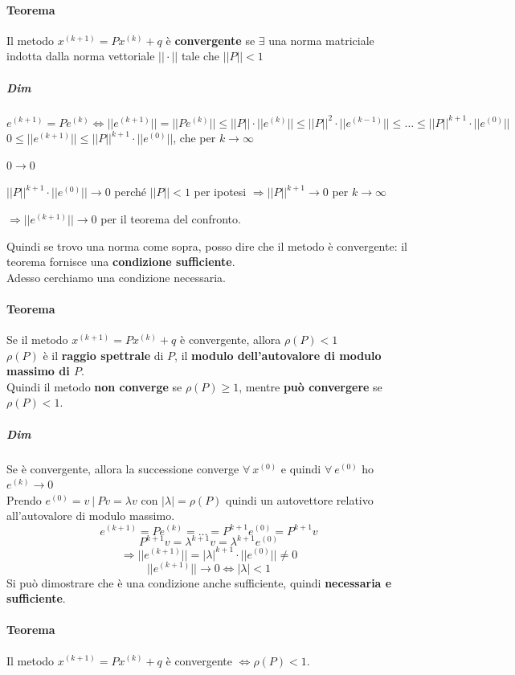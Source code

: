 \documentclass[10pt]{book}
\begin{document}
\paragraph{Teorema} Il metodo $x^{(k+1)} = Px^{(k)} + q$ è \textbf{convergente} se $\exists$ una norma matriciale indotta dalla norma vettoriale $||\cdot||$ tale che $||P|| < 1$
\subparagraph{Dim} $e^{(k + 1)} = Pe^{(k)} \Leftrightarrow ||e^{(k + 1)}|| = ||Pe^{(k)}|| \leq ||P||\cdot||e^{(k)}|| \leq ||P||^2\cdot||e^{(k-1)}|| \leq \ldots \leq ||P||^{k+1}\cdot||e^{(0)}||$\\
$0 \leq ||e^{(k+1)}|| \leq ||P||^{k+1}\cdot||e^{(0)}||$, che per $k\to\infty$
\begin{list}{}{}
	\item $0\to 0$
	\item $||P||^{k+1}\cdot||e^{(0)}||\to 0$ perché $||P|| < 1$ per ipotesi $\Rightarrow||P||^{k+1}\to 0$ per $k\to\infty$
	\item $\Rightarrow||e^{(k+1)}||\to 0$ per il teorema del confronto.
\end{list}
Quindi se trovo una norma come sopra, posso dire che il metodo è convergente: il teorema fornisce una \textbf{condizione sufficiente}.\\
Adesso cerchiamo una condizione necessaria.
\paragraph{Teorema} Se il metodo $x^{(k+1)} = Px^{(k)} + q$ è convergente, allora $\rho(P) < 1$\\
$\rho(P)$ è il \textbf{raggio spettrale} di $P$, il \textbf{modulo dell'autovalore di modulo massimo di $P$}.\\
Quindi il metodo \textbf{non converge} se $\rho(P) \geq 1$, mentre \textbf{può convergere} se $\rho(P) < 1$.
\subparagraph{Dim} Se è convergente, allora la successione converge $\forall\: x^{(0)}$ e quindi $\forall\:e^{(0)}$ ho $e^{(k)}\to 0$\\
Prendo $e^{(0)} = v\:|\: Pv = \lambda v$ con $|\lambda| = \rho(P)$ quindi un autovettore relativo all'autovalore di modulo massimo.
$$e^{(k+1)} = Pe^{(k)} = \ldots = P^{k+1}e^{(0)} = P^{k+1}v$$
$$P^{k+1}v = \lambda^{k+1}v = \lambda^{k+1}e^{(0)}$$
$$\Rightarrow||e^{(k+1)}|| = |\lambda|^{k+1}\cdot||e^{(0)}|| \neq 0$$
$$||e^{(k+1)}||\to 0 \Leftrightarrow |\lambda| < 1$$
Si può dimostrare che è una condizione anche sufficiente, quindi \textbf{necessaria e sufficiente}.
\paragraph{Teorema} Il metodo $x^{(k+1)} = Px^{(k)} + q$ è convergente $\Leftrightarrow \rho(P) < 1$.
\end{document}
